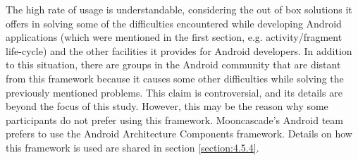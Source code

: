 The high rate of usage is understandable, considering the out of box solutions it offers in solving some of the difficulties encountered while developing Android applications (which were mentioned in the first section, e.g. activity/fragment life-cycle) and the other facilities it provides for Android developers. In addition to this situation, there are groups in the Android community that are distant from this framework because it causes some other difficulties while solving the previously mentioned problems. This claim is controversial, and its details are beyond the focus of this study. However, this may be the reason why some participants do not prefer using this framework.
 Mooncascade's Android team prefers to use the Android Architecture Components framework. Details on how this framework is used are shared in section \ref{section:4.5.4}.